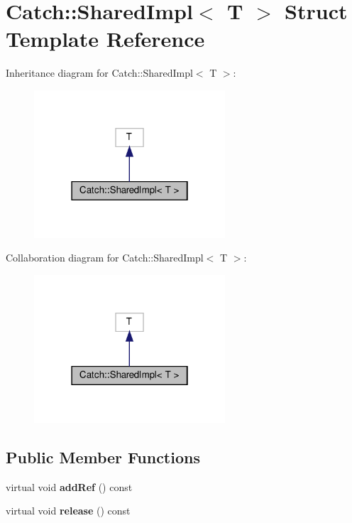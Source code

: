 \hypertarget{structCatch_1_1SharedImpl}{}\section{Catch\+:\+:Shared\+Impl$<$ T $>$ Struct Template Reference}
\label{structCatch_1_1SharedImpl}


Inheritance diagram for Catch\+:\+:Shared\+Impl$<$ T $>$\+:\nopagebreak
\begin{figure}[H]
\begin{center}
\leavevmode
\includegraphics[width=202pt]{structCatch_1_1SharedImpl__inherit__graph}
\end{center}
\end{figure}


Collaboration diagram for Catch\+:\+:Shared\+Impl$<$ T $>$\+:\nopagebreak
\begin{figure}[H]
\begin{center}
\leavevmode
\includegraphics[width=202pt]{structCatch_1_1SharedImpl__coll__graph}
\end{center}
\end{figure}
\subsection*{Public Member Functions}
\begin{DoxyCompactItemize}
\item 
\mbox{\label{structCatch_1_1SharedImpl_a5d1a4c96e8fc07c821890fd09749062e}} 
virtual void {\bfseries add\+Ref} () const
\item 
\mbox{\label{structCatch_1_1SharedImpl_ada8052c6f24fd73ec099333626f106fe}} 
virtual void {\bfseries release} () const
\end{DoxyCompactItemize}
